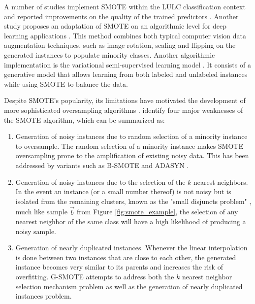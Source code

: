 \documentclass[authoryear,preprint,12pt]{elsarticle}
\begin{document}
\begin{linenumbers}
A number of studies implement SMOTE within the LULC classification context and
reported improvements on the quality of the trained predictors
\citep{Jozdani2019, Bogner2018}. Another study proposes an adaptation of SMOTE
on an algorithmic level for deep learning applications \citep{Zhu2020}. This
method combines both typical computer vision data augmentation techniques,
such as image rotation, scaling and flipping on the generated instances to
populate minority classes. Another algorithmic implementation is the
variational semi-supervised learning model \citep{Cenggoro2018}. It consists of
a generative model that allows learning from both labeled and unlabeled
instances while using SMOTE to balance the data.

Despite SMOTE's popularity, its limitations have motivated the development of
more sophisticated oversampling algorithms \citep{Douzas2019, Han2005, Ma2017,
Douzas2017, Douzas2018, HaiboHe2008}. \cite{Douzas2019} identify four major
weaknesses of the SMOTE algorithm, which can be summarized as:

\begin{enumerate}
    \item Generation of noisy instances due to random selection of a
        minority instance to oversample. The random
        selection of a minority instance makes SMOTE
        oversampling prone to the amplification of existing noisy data. This
        has been addressed by variants such as B-SMOTE \citep{Han2005} and
        ADASYN \citep{HaiboHe2008}. 

    \item Generation of noisy instances due to the selection of the $k$
        nearest neighbors. In the event an instance
        (or a small number thereof) is not noisy but is isolated from the
        remaining clusters, known as the "small disjuncts problem"
        \citep{holte1989}, much like sample $\overrightarrow{b}$ from Figure
        \ref{fig:smote_example}, the selection of any nearest neighbor of the
        same class will have a high likelihood of producing a noisy sample.

    \item Generation of nearly duplicated instances. Whenever the linear
        interpolation is done between two instances that are close to each
        other, the generated instance becomes very similar to its parents and
        increases the risk of overfitting. G-SMOTE \citep{Douzas2019} attempts
        to address both the $k$ nearest neighbor selection mechanism problem
        as well as the generation of nearly duplicated instances problem. 


\end{enumerate}
\end{linenumbers}
\end{document}
